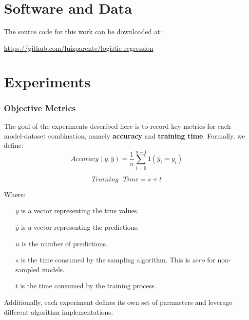 \documentclass{article}
\theoremstyle{plain}
\theoremstyle{definition}
\theoremstyle{remark}
\begin{document}
\section*{Software and Data}

The source code for this work can be downloaded at:

\url{https://github.com/luizparente/logistic-regression}






\newpage
\appendix
\twocolumn
\section{Experiments}

\subsubsection{Objective Metrics}

The goal of the experiments described here is to record key metrics for each model-dataset combination, namely \textbf{accuracy} and \textbf{training time}. Formally, we define:
$$
Accuracy(y, \hat{y}) = \frac{1}{n} \sum_{i=0}^{n-1} 1(\hat{y}_i = y_i)
$$

$$
Training\text{ }Time = s + t
$$

Where:

\begin{itemize}

\item[$y$] is a vector representing the true values.
\item[$\hat{y}$] is a vector representing the predictions.
\item[$n$] is the number of predictions.
\item[$s$] is the time consumed by the sampling algorithm. This is $zero$ for non-sampled models.
\item[$t$] is the time consumed by the training process.

\end{itemize}

Additionally, each experiment defines its own set of parameters and leverage different algorithm implementations.
\end{document}
